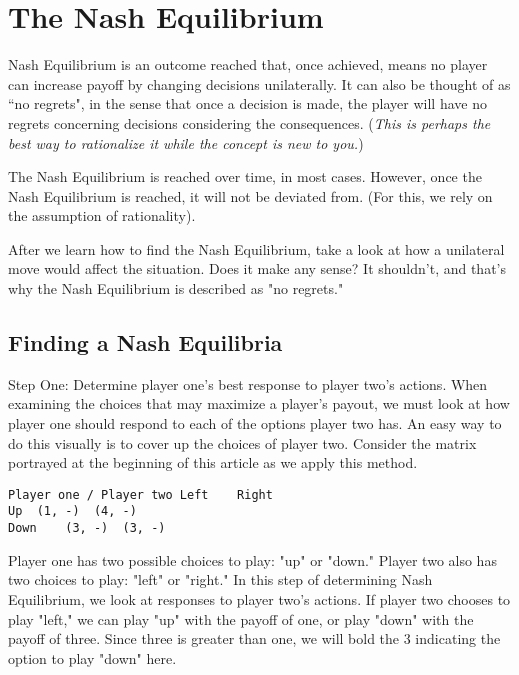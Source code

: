 \documentclass[11pt]{article} %
\begin{document}

\section{The Nash Equilibrium}
Nash Equilibrium is an outcome reached that, once achieved, means no player can increase payoff by changing decisions unilaterally. It can also be thought of as ``no regrets", in the sense that once a decision is made, the player will have no regrets concerning decisions considering the consequences. (\textit{This is perhaps the best way to rationalize it while the concept is new to you.})

\smallskip

The Nash Equilibrium is reached over time, in most cases. However, once the Nash Equilibrium is reached, it will not be deviated from. (For this, we rely on the assumption of rationality).

\smallskip

After we learn how to find the Nash Equilibrium, take a look at how a unilateral move would affect the situation. Does it make any sense? It shouldn't, and that's why the Nash Equilibrium is described as "no regrets."

\subsection{Finding a Nash Equilibria}
Step One: Determine player one's best response to player two's actions.
When examining the choices that may maximize a player's payout, we must look at how player one should respond to each of the options player two has. An easy way to do this visually is to cover up the choices of player two. Consider the matrix portrayed at the beginning of this article as we apply this method.
\begin{verbatim}
Player one / Player two	Left	Right
Up	(1, -)	(4, -)
Down	(3, -)	(3, -)
\end{verbatim}
Player one has two possible choices to play: "up" or "down." Player two also has two choices to play: "left" or "right." In this step of determining Nash Equilibrium, we look at responses to player two's actions. If player two chooses to play "left," we can play "up" with the payoff of one, or play "down" with the payoff of three. Since three is greater than one, we will bold the 3 indicating the option to play "down" here.
\end{document}
